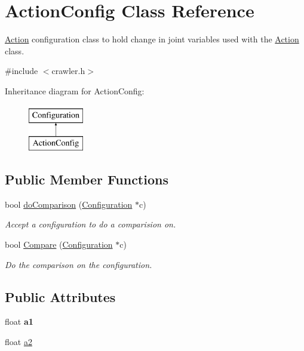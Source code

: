 \hypertarget{classActionConfig}{\section{Action\-Config Class Reference}
\label{classActionConfig}
}


\hyperlink{classAction}{Action} configuration class to hold change in joint variables used with the \hyperlink{classAction}{Action} class.  




{\ttfamily \#include $<$crawler.\-h$>$}

Inheritance diagram for Action\-Config\-:\begin{figure}[H]
\begin{center}
\leavevmode
\includegraphics[height=2.000000cm]{classActionConfig}
\end{center}
\end{figure}
\subsection*{Public Member Functions}
\begin{DoxyCompactItemize}
\item 
bool \hyperlink{classActionConfig_a822bda3a3ae83a30d6e7d297ca80c451}{do\-Comparison} (\hyperlink{classConfiguration}{Configuration} $\ast$c)
\begin{DoxyCompactList}\small\item\em Accept a configuration to do a comparision on. \end{DoxyCompactList}\item 
bool \hyperlink{classActionConfig_adbf2b04b558792a6fcfef7a52d16411c}{Compare} (\hyperlink{classConfiguration}{Configuration} $\ast$c)
\begin{DoxyCompactList}\small\item\em Do the comparison on the configuration. \end{DoxyCompactList}\end{DoxyCompactItemize}
\subsection*{Public Attributes}
\begin{DoxyCompactItemize}
\item 
\hypertarget{classActionConfig_ac633fa67b421cf574fd42f01179c5d49}{float {\bfseries a1}}\label{classActionConfig_ac633fa67b421cf574fd42f01179c5d49}

\item 
float \hyperlink{classActionConfig_a6e64f27b8bc62c437d43d45a0bc201c8}{a2}
\end{DoxyCompactItemize}


